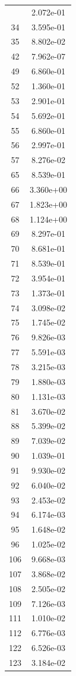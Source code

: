 \documentclass[12pt]{article}
\begin{document}
\begin{longtable}{@{}cc@{}}
\bottomrule
\endlastfoot
32 & 2.072e-01 \\
34 & 3.595e-01 \\
35 & 8.802e-02 \\
42 & 7.962e-07 \\
49 & 6.860e-01 \\
52 & 1.360e-01 \\
53 & 2.901e-01 \\
54 & 5.692e-01 \\
55 & 6.860e-01 \\
56 & 2.997e-01 \\
57 & 8.276e-02 \\
65 & 8.539e-01 \\
66 & 3.360e+00 \\
67 & 1.823e+00 \\
68 & 1.124e+00 \\
69 & 8.297e-01 \\
70 & 8.681e-01 \\
71 & 8.539e-01 \\
72 & 3.954e-01 \\
73 & 1.373e-01 \\
74 & 3.098e-02 \\
75 & 1.745e-02 \\
76 & 9.826e-03 \\
77 & 5.591e-03 \\
78 & 3.215e-03 \\
79 & 1.880e-03 \\
80 & 1.131e-03 \\
81 & 3.670e-02 \\
88 & 5.399e-02 \\
89 & 7.039e-02 \\
90 & 1.039e-01 \\
91 & 9.930e-02 \\
92 & 6.040e-02 \\
93 & 2.453e-02 \\
94 & 6.174e-03 \\
95 & 1.648e-02 \\
96 & 1.025e-02 \\
106 & 9.668e-03 \\
107 & 3.868e-02 \\
108 & 2.505e-02 \\
109 & 7.126e-03 \\
111 & 1.010e-02 \\
112 & 6.776e-03 \\
122 & 6.526e-03 \\
123 & 3.184e-02 \\

\end{longtable}
\end{document}
